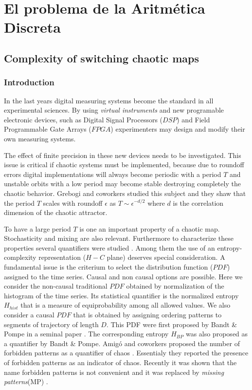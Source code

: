\chapter{El problema de la Aritmética Discreta}



\section{Complexity of switching chaotic maps}

\subsection{Introduction}
In the last years digital measuring systems become the standard in
all experimental sciences. By using \emph{virtual instruments} and new programable electronic
devices, such as Digital Signal Processors ($DSP$) and Field
Programmable Gate Arrays ($FPGA$)  experimenters may design and
modify their own measuring systems.

The effect of finite precision in these new devices needs to be
investigated. This issue is critical if  chaotic systems must be implemented, because due to roundoff errors digital implementations will always become periodic with a period $T$ and unstable orbits with a low period may become stable destroying completely the chaotic behavior.  
Grebogi and coworkers \cite{Grebogi1988} studied this subject and they shaw that the period $T$ scales with roundoff $\epsilon$ as
$T\sim\epsilon^{-d/2}$ where $d$ is the correlation dimension of
the chaotic attractor. 

To have a large period $T$ is one an important property of a chaotic map. Stochasticity and mixing are also relevant. Furthermore to characterize these properties several quantifiers were
studied  \cite{DeMicco2009}. Among them the use of an
entropy-complexity representation ($H-C$ plane) deserves special
consideration\cite{Rosso2007C,DeMicco2008,DeMicco2011,DeMicco2009,Rosso2009}. 
A fundamental issue is the criterium to select the distribution function ($PDF$) assigned to the time series. Causal and non causal options are possible. Here we consider the non-causal traditional $PDF$ obtained by normalization of the histogram of the time series. Its statistical quantifier is the normalized entropy$H_{hist}$ that is  a measure of equiprobability among all allowed values. We also consider a causal $PDF$  that is obtained by assigning ordering patterns to segments of trajectory of length $D$. This PDF were first proposed by Bandt \& Pompe in a seminal paper \cite{Pompe2002}. The corresponding entropy $H_{BP}$ was also proposed as a quantifier by Bandt \& Pompe. Amig\'o and coworkers proposed the number of forbidden patterns as a quantifier of chaos \cite{Amigo2007b}. Essentialy they reported the presence of forbidden patterns as an indicator of chaos. Recently it was shown that the name forbidden patterns is not convenient and it was replaced by  \emph{missing patterns}(MP) \cite{Rosso2012b}. 

